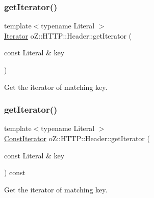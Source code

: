 \subsubsection{\texorpdfstring{getIterator()}{getIterator()}\hspace{0.1cm}{\footnotesize\ttfamily [1/2]}}
{\footnotesize\ttfamily template$<$typename Literal $>$ \\
\mbox{\hyperlink{classo_z_1_1_h_t_t_p_1_1_header_a572d529cae124a02fb68df9c3e51c576}{Iterator}} o\+Z\+::\+H\+T\+T\+P\+::\+Header\+::get\+Iterator (\begin{DoxyParamCaption}\item[{const Literal \&}]{key }\end{DoxyParamCaption})\hspace{0.3cm}{\ttfamily [inline]}}



Get the iterator of matching key. 

\mbox{\label{classo_z_1_1_h_t_t_p_1_1_header_a43a6b9a03c9a46c4eeee0df3c3990d63}} 
\subsubsection{\texorpdfstring{getIterator()}{getIterator()}\hspace{0.1cm}{\footnotesize\ttfamily [2/2]}}
{\footnotesize\ttfamily template$<$typename Literal $>$ \\
\mbox{\hyperlink{classo_z_1_1_h_t_t_p_1_1_header_a509c1ea8f5b221246e6e49c01a115d69}{Const\+Iterator}} o\+Z\+::\+H\+T\+T\+P\+::\+Header\+::get\+Iterator (\begin{DoxyParamCaption}\item[{const Literal \&}]{key }\end{DoxyParamCaption}) const\hspace{0.3cm}{\ttfamily [inline]}}



Get the iterator of matching key. 

\mbox{\label{classo_z_1_1_h_t_t_p_1_1_header_ae30e471f7d522477cf022531a84e727a}} 
